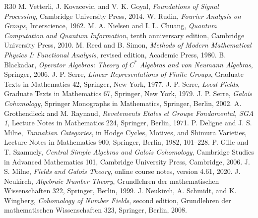 \documentclass[9pt]{article}
\begin{document}
\begin{thebibliography}{R30}
 M. Vetterli, J. Kovacevic, and V. K. Goyal, \emph{Foundations of Signal Processing}, Cambridge University Press, 2014.
 W. Rudin, \emph{Fourier Analysis on Groups}, Interscience, 1962.
 M. A. Nielsen and I. L. Chuang, \emph{Quantum Computation and Quantum Information}, tenth anniversary edition, Cambridge University Press, 2010.
 M. Reed and B. Simon, \emph{Methods of Modern Mathematical Physics I: Functional Analysis}, revised edition, Academic Press, 1980.
 B. Blackadar, \emph{Operator Algebras: Theory of \(C^*\) Algebras and von Neumann Algebras}, Springer, 2006.
 J. P. Serre, \emph{Linear Representations of Finite Groups}, Graduate Texts in Mathematics 42, Springer, New York, 1977.
 J. P. Serre, \emph{Local Fields}, Graduate Texts in Mathematics 67, Springer, New York, 1979.
 J. P. Serre, \emph{Galois Cohomology}, Springer Monographs in Mathematics, Springer, Berlin, 2002.
 A. Grothendieck and M. Raynaud, \emph{Revetements Etales et Groupe Fondamental, SGA 1}, Lecture Notes in Mathematics 224, Springer, Berlin, 1971.
 P. Deligne and J. S. Milne, \emph{Tannakian Categories}, in Hodge Cycles, Motives, and Shimura Varieties, Lecture Notes in Mathematics 900, Springer, Berlin, 1982, 101--228.
 P. Gille and T. Szamuely, \emph{Central Simple Algebras and Galois Cohomology}, Cambridge Studies in Advanced Mathematics 101, Cambridge University Press, Cambridge, 2006.
 J. S. Milne, \emph{Fields and Galois Theory}, online course notes, version 4.61, 2020.
 J. Neukirch, \emph{Algebraic Number Theory}, Grundlehren der mathematischen Wissenschaften 322, Springer, Berlin, 1999.
 J. Neukirch, A. Schmidt, and K. Wingberg, \emph{Cohomology of Number Fields}, second edition, Grundlehren der mathematischen Wissenschaften 323, Springer, Berlin, 2008.
\end{thebibliography}
\end{document}
